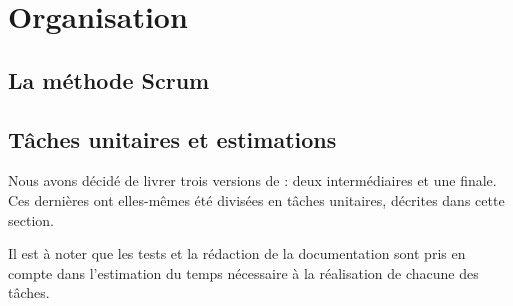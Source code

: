 \section{Organisation}
	\label{sec:orga}
	\subsection{La méthode Scrum}

	
	\subsection{Tâches unitaires et estimations}
	\label{sec:taches_unitaires}

	Nous avons décidé de livrer trois versions de \glasir{} : deux intermédiaires et une finale. Ces dernières ont elles-mêmes été divisées en tâches unitaires, décrites dans cette section. 
	
	Il est à noter que les tests et la rédaction de la documentation sont pris en compte dans l'estimation du temps nécessaire à la réalisation de chacune des tâches.
	

